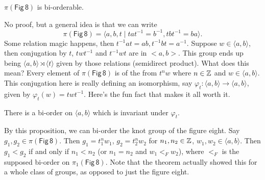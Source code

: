 \begin{theorem}
    $\pi(\mathsf{Fig \,8} )$ is bi-orderable. 
\end{theorem}
No proof, but a general idea is that we can write \[
 \pi(\mathsf{Fig \,8} )=\langle a,b,t \mid tat^{-1}=b^{-1},tbt^{-1}=ba \rangle .
\] Some relation magic happens, then $t^{-1}at=ab,t^{-1}bt=a^{-1}$. Suppose $w\in \langle a,b \rangle $, then conjugation by $t$,  $twt^{-1}$ and $t^{-1}wt$ are in $<a,b>$. This group ends up being $\langle a,b \rangle \rtimes \langle t \rangle $ given by those relations (semidirect product). What does this mean? Every element of $\pi(\mathsf{Fig\,8}) $ is of the from $t ^n w$ where $n\in \mathbb{Z}$ and $w\in \langle a,b \rangle $. This conjugation here is really defining an isomorphism, say $\varphi_t \colon \langle a,b \rangle  \to \langle a,b \rangle  $, given by $\varphi _t(w)=twt^{-1}$. Here's the fun fact that makes it all worth it.
\begin{prop}
    There is a bi-order on $\langle a,b \rangle $ which is invariant under $\varphi _t$.
\end{prop}
By this proposition, we can bi-order the knot group of the figure eight. Say $g_1,g_2\in \pi(\mathsf{Fig\, 8} )$. Then $g_1=t ^n_1 w_1$, $g_2=t ^n_2w_2 $ for $n_1,n_2\in \mathbb{Z}$, $w_1,w_2\in \langle a,b \rangle $. Then $g_1<g_2$ if and only if $n_1<n_2$ (or $n_1=n_2$ and $w_1<_F w_2$), where $<_F$ is the supposed bi-order on $\pi_1 (\mathsf{Fig\,8} )$. Note that the theorem actually showed this for a whole class of groups, as opposed to just the figure eight.
